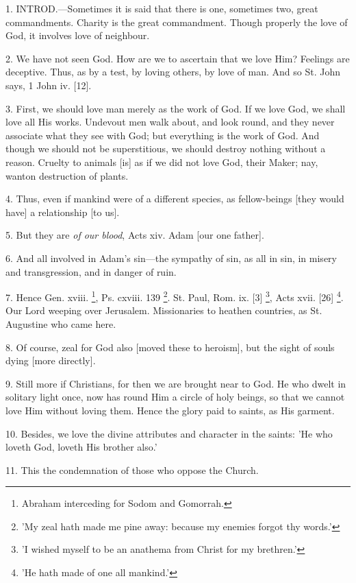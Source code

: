 
1. INTROD.—Sometimes
it is said that there is one, sometimes two, great commandments.
Charity is the great commandment. Though properly the love of God, it
involves love of neighbour.

2. We have not seen God. How are we to ascertain
that we love Him? Feelings are deceptive. Thus, as by a test, by
loving others, by love of man. And so St. John says, 1 John iv. [12].

3. First, we should love man merely as the work
of God. If we love God, we shall love all His works. Undevout men walk
about, and look round, and they never associate what they see with
God; but everything is the work of God. And though we should not be
superstitious, we should destroy nothing without a reason. Cruelty to
animals [is] as if we did not love God, their Maker; nay, wanton
destruction of plants.

4. Thus, even if mankind were of a different
species, as fellow-beings [they would have] a relationship [to us].

5. But they are \emph{of our blood}, Acts xiv.
Adam [our one father].

6. And all involved in Adam's sin—the sympathy
of sin, as all in sin, in misery and transgression, and in
danger of ruin.

7. Hence Gen. xviii. \footnote{Abraham interceding for
Sodom and Gomorrah.}, Ps. cxviii. 139 \footnote{'My zeal hath made me pine
away: because my enemies forgot thy words.'}.
St. Paul, Rom. ix. [3] \footnote{'I wished myself to be
an anathema from Christ for my brethren.'},
Acts xvii. [26] \footnote{'He hath made of one all
mankind.'}. Our
Lord weeping over Jerusalem. Missionaries to heathen countries, as St.
Augustine who came here.

8. Of course, zeal for God also [moved these to
heroism], but the sight of souls dying [more directly].

9. Still more if Christians, for then we are
brought near to God. He who dwelt in solitary light once, now has
round Him a circle of holy beings, so that we cannot love Him without
loving them. Hence the glory paid to saints, as His garment.

10. Besides, we love the divine attributes and
character in the saints: 'He who loveth God, loveth His brother also.'

11. This the condemnation of those who oppose the
Church.

